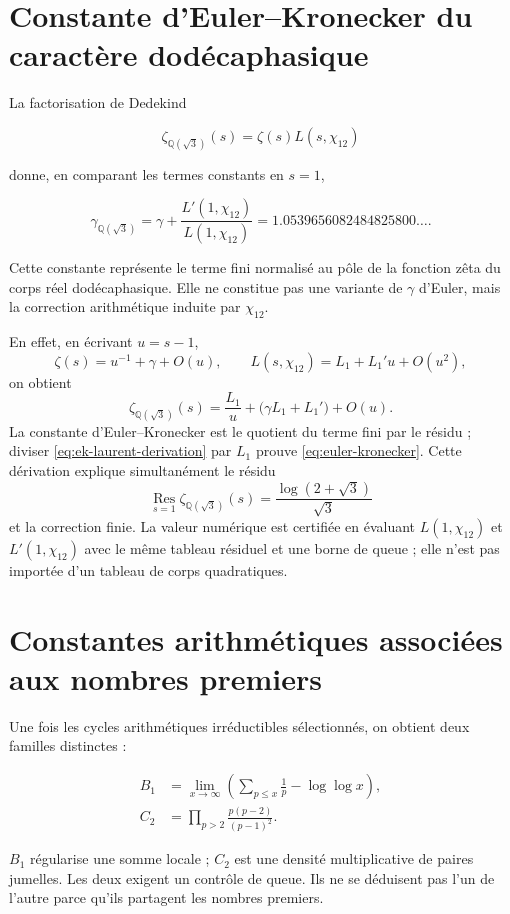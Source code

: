 \section{Constante d'Euler--Kronecker du caractère dodécaphasique}

La factorisation de Dedekind

\begin{equation}
\zeta_{\mathbb Q(\sqrt3)}(s)=\zeta(s)L(s,\chi_{12})
\label{eq:dedekind-sqrt3}
\end{equation}

donne, en comparant les termes constants en \(s=1\),

\begin{equation}
\gamma_{\mathbb Q(\sqrt3)}
=\gamma+\frac{L'(1,\chi_{12})}{L(1,\chi_{12})}
=1.0539656082484825800\ldots.
\label{eq:euler-kronecker}
\end{equation}

Cette constante représente le terme fini normalisé au pôle de la
fonction zêta du corps réel dodécaphasique. Elle ne constitue pas une variante de
\(\gamma\) d'Euler, mais la correction arithmétique induite par
\(\chi_{12}\).

En effet, en écrivant \(u=s-1\),
\[
\zeta(s)=u^{-1}+\gamma+O(u),
\qquad
L(s,\chi_{12})=L_1+L_1'u+O(u^2),
\]
on obtient
\begin{equation}
\zeta_{\mathbb Q(\sqrt3)}(s)
=\frac{L_1}{u}+\bigl(\gamma L_1+L_1'\bigr)+O(u).
\label{eq:ek-laurent-derivation}
\end{equation}
La constante d'Euler--Kronecker est le quotient du terme fini par
le résidu ; diviser \cref{eq:ek-laurent-derivation} par \(L_1\) prouve
\cref{eq:euler-kronecker}. Cette dérivation explique simultanément le
résidu
\[
\operatorname*{Res}_{s=1}\zeta_{\mathbb Q(\sqrt3)}(s)
=\frac{\log(2+\sqrt3)}{\sqrt3}
\]
et la correction finie. La valeur numérique est certifiée en évaluant
\(L(1,\chi_{12})\) et \(L'(1,\chi_{12})\) avec le même tableau résiduel et une
borne de queue ; elle n'est pas importée d'un tableau de corps quadratiques.

\section{Constantes arithmétiques associées aux nombres premiers}

Une fois les cycles arithmétiques irréductibles sélectionnés, on obtient deux
familles distinctes :

\begin{align}
B_1&=\lim_{x\to\infty}\left(
\sum_{p\le x}\frac1p-\log\log x
\right),
\label{eq:meissel-mertens}\\
C_2&=\prod_{p>2}\frac{p(p-2)}{(p-1)^2}.
\label{eq:twin-prime-constant}
\end{align}

\(B_1\) régularise une somme locale ; \(C_2\) est une densité multiplicative de paires jumelles. Les deux exigent un contrôle de queue. Ils ne se déduisent pas l'un de l'autre parce qu'ils partagent les nombres premiers.

